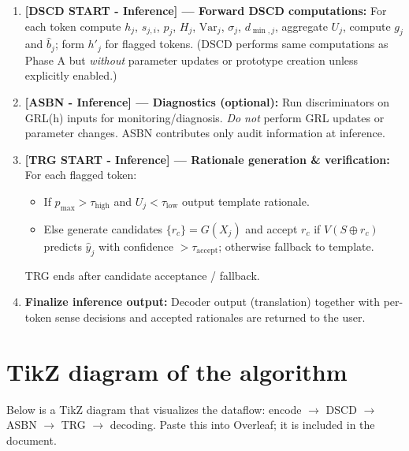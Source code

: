 \documentclass[11pt]{article}
\begin{document}
\begin{enumerate}
  \item \textbf{[DSCD START - Inference] --- Forward DSCD computations:} For each token compute $h_j$, $s_{j,i}$, $p_j$, $H_j$, $\mathrm{Var}_j$, $\sigma_j$, $d_{\min,j}$, aggregate $U_j$, compute $g_j$ and $\hat b_j$; form $h'_j$ for flagged tokens. (DSCD performs same computations as Phase A but \emph{without} parameter updates or prototype creation unless explicitly enabled.)
  
  \item \textbf{[ASBN - Inference] --- Diagnostics (optional):} Run discriminators on GRL(h) inputs for monitoring/diagnosis. \emph{Do not} perform GRL updates or parameter changes. ASBN contributes only audit information at inference.
  
  \item \textbf{[TRG START - Inference] --- Rationale generation \& verification:} For each flagged token:
    \begin{itemize}
      \item If $p_{\max}>\tau_{\text{high}}$ and $U_j<\tau_{\text{low}}$ output template rationale.
      \item Else generate candidates $\{r_c\}=G(X_j)$ and accept $r_c$ if $V(S\oplus r_c)$ predicts $\hat y_j$ with confidence $>\tau_{\text{accept}}$; otherwise fallback to template.
    \end{itemize}
    TRG ends after candidate acceptance / fallback.
  
  \item \textbf{Finalize inference output:} Decoder output (translation) together with per-token sense decisions and accepted rationales are returned to the user.
\end{enumerate}


\section{TikZ diagram of the algorithm}
Below is a TikZ diagram that visualizes the dataflow: encode $\rightarrow$ DSCD $\rightarrow$ ASBN $\rightarrow$ TRG $\rightarrow$ decoding. Paste this into Overleaf; it is included in the document.


\end{document}
